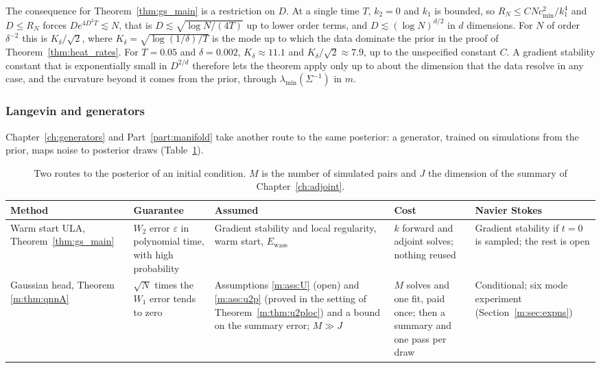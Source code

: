 The consequence for Theorem~\ref{thm:gs_main} is a restriction on $D$. At a single time $T$, $k_2=0$ and $k_1$ is bounded, so $R_N\le CNc_{\min}^2/k_1^4$ and $D\le R_N$ forces $De^{4D^2T}\lesssim N$, that is $D\lesssim\sqrt{\log N/(4T)}$ up to lower order terms, and $D\lesssim(\log N)^{d/2}$ in $d$ dimensions. For $N$ of order $\delta^{-2}$ this is $K_\delta/\sqrt2$, where $K_\delta=\sqrt{\log(1/\delta)/T}$ is the mode up to which the data dominate the prior in the proof of Theorem~\ref{thm:heat_rates}. For $T=0.05$ and $\delta=0.002$, $K_\delta\approx11.1$ and $K_\delta/\sqrt2\approx7.9$, up to the unspecified constant $C$. A gradient stability constant that is exponentially small in $D^{2/d}$ therefore lets the theorem apply only up to about the dimension that the data resolve in any case, and the curvature beyond it comes from the prior, through $\lambda_{\min}(\Sigma^{-1})$ in $m$.

\subsubsection{Langevin and generators} Chapter~\ref{ch:generators} and Part~\ref{part:manifold} take another route to the same posterior: a generator, trained on simulations from the prior, maps noise to posterior draws (Table~\ref{tab:gs_compare}).

\begin{table}[t]\centering\footnotesize\setlength{\tabcolsep}{3pt}
\caption{Two routes to the posterior of an initial condition. $M$ is the number of simulated pairs and $J$ the dimension of the summary of Chapter~\ref{ch:adjoint}.}\label{tab:gs_compare}
\begin{tabular}{@{}>{\raggedright\arraybackslash}p{0.72in}>{\raggedright\arraybackslash}p{0.84in}>{\raggedright\arraybackslash}p{0.84in}>{\raggedright\arraybackslash}p{0.80in}>{\raggedright\arraybackslash}p{0.90in}@{}}
\toprule
Method & Guarantee & Assumed & Cost & Navier Stokes\\
\midrule
Warm start ULA, Theorem~\ref{thm:gs_main} & $W_2$ error $\varepsilon$ in polynomial time, with high probability & Gradient stability and local regularity, warm start, $E_{\mathrm{wass}}$ & $k$ forward and adjoint solves; nothing reused & Gradient stability if $t=0$ is sampled; the rest is open\\
\addlinespace
Gaussian head, Theorem \ref{m:thm:qnnA} & $\sqrt N$ times the $W_1$ error tends to zero & Assumptions \ref{m:ass:U} (open) and \ref{m:ass:u2p} (proved in the setting of Theorem~\ref{m:thm:u2ploc}) and a bound on the summary error; $M\gg J$ & $M$ solves and one fit, paid once; then a summary and one pass per draw & Conditional; six mode experiment (Section~\ref{m:sec:expns})\\
\bottomrule
\end{tabular}
\end{table}

